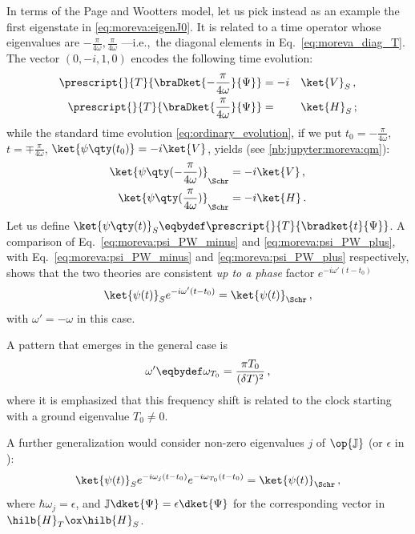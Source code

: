 In terms of the Page and Wootters model,
let us pick instead as an example the first eigenstate in \eqref{eq:moreva:eigenJ0}.
It is related to a time operator whose eigenvalues are
$-\frac{\pi}{4\omega}, \frac{\pi}{4\omega}$
---i.e.,~the diagonal elements in Eq.~\eqref{eq:moreva_diag_T}.
The vector $(0, -i, 1, 0)$ encodes
the following time evolution:
\begin{alignat}{5}
  \prescript{}{T}{\braDket{-\frac{\pi}{4\omega}}{\Psi}} &= -i&&\ket{V}_S
  \, \text{,} \label{eq:moreva:psi_PW_minus}
  \\
  \prescript{}{T}{\braDket{\frac{\pi}{4\omega}}{\Psi}}  &=   &&\ket{H}_S
  \, \text{;} \label{eq:moreva:psi_PW_plus}
\end{alignat}
while the standard time evolution \eqref{eq:ordinary_evolution}, if we put
$t_0 = -\frac{\pi}{4\omega}$, $t = \mp\frac{\pi}{4\omega}$, $\ket{\psi\qty(t_0)} = -i\ket{V}$,
yields (see \ref{nb:jupyter:moreva:qm}):
\begin{align}
  \ket{\psi\qty(-\frac{\pi}{4\omega})}_{\Schr} &= -i\ket{V}
  \, \text{,} \label{eq:moreva:psi_Schr_minus}
  \\
  \ket{\psi\qty( \frac{\pi}{4\omega})}_{\Schr} &= -i\ket{H}
  \, \text{.} \label{eq:moreva:psi_Schr_plus}
\end{align}
Let us define $\ket{\psi\qty(t)}_{S} \eqbydef \prescript{}{T}{\bradket{t}{\Psi}}$.
A comparison of Eq.~\eqref{eq:moreva:psi_PW_minus} and \eqref{eq:moreva:psi_PW_plus},
with Eq.~\eqref{eq:moreva:psi_PW_minus} and \eqref{eq:moreva:psi_PW_plus} respectively,
shows that the two theories are consistent \emph{up to a phase} factor
$e^{-i\omega'(t - t_{0})}$
\begin{equation}
  \ket{\psi(t)}_S e^{-i\omega'(t - t_{0})} = \ket{\psi(t)}_{\Schr} \,\text{,}
\end{equation}
with $\omega' = -\omega$ in this case.

A pattern that emerges in the general case is
\[
  \omega' \eqbydef \omega_{T_{0}} = \frac{\pi T_0}{(\delta T)^2} \,\text{,}
\]
where it is emphasized that this frequency shift is related to the clock starting
with a ground eigenvalue $T_0 \ne 0$.

A further generalization would consider non-zero eigenvalues $j$ of $\op{\mathbb{J}}$
(or $\epsilon$ in \cite[eq. 16]{Lloyd:Time}):
\begin{equation}\label{eq:pw-vs-qm}
  \ket{\psi(t)}_{S} e^{-i\omega_{j}(t - t_{0})} e^{-i\omega_{T_0}(t - t_{0})} = \ket{\psi(t)}_{\Schr} \,\text{,}
\end{equation}
where $\hbar\omega_j = \epsilon$,
and $\mathbb{J}\dket{\Psi} = \epsilon \dket{\Psi}$
for the corresponding vector in $\hilb{H}_T \ox \hilb{H}_S$.

